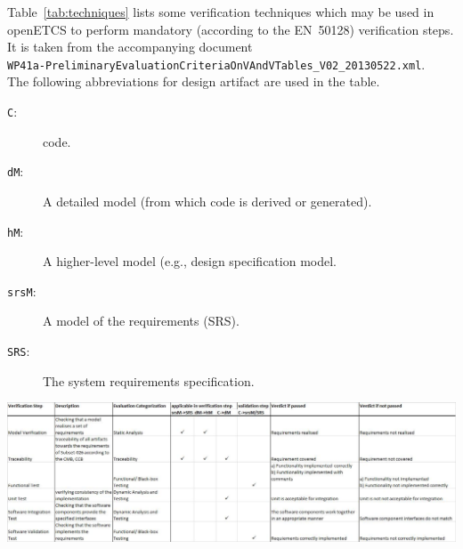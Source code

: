 \documentclass{template/openetcs_article}
\begin{document}
Table~\ref{tab:techniques} lists some verification techniques which may be
used in openETCS to perform mandatory (according to the EN~50128)
verification steps. It is taken from the accompanying document\\
\texttt{WP41a-PreliminaryEvaluationCriteriaOnVAndVTables\_V02\_20130522.xml}. 
\\ The following abbreviations for design artifact are used in the table.
\begin{description}
\item[\texttt{C}:] code.
\item[\texttt{dM}:] A detailed model (from which code is derived or generated).
\item[\texttt{hM}:] A higher-level model (e.g., design specification model.
\item[\texttt{srsM}:] A model of the requirements (SRS).
\item[\texttt{SRS}:] The system requirements specification. 
\end{description}


\begin{table}[h]
\caption{Verification Steps and Techniques in openETCS} %
\label{tab:techniques}
\includegraphics[width=\textwidth]{techniques.pdf}
\end{table}
\end{document}
